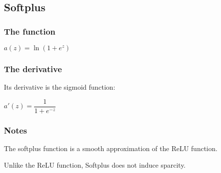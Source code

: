 
\subsection{Softplus}

\subsubsection{The function}

\(a(z)=\ln (1+e^z)\)

\subsubsection{The derivative}

Its derivative is the sigmoid function:

\(a'(z)=\dfrac{1}{1+e^{-z}}\)

\subsubsection{Notes}

The softplus function is a smooth approximation of the ReLU function.

Unlike the ReLU function, Softplus does not induce sparcity.

